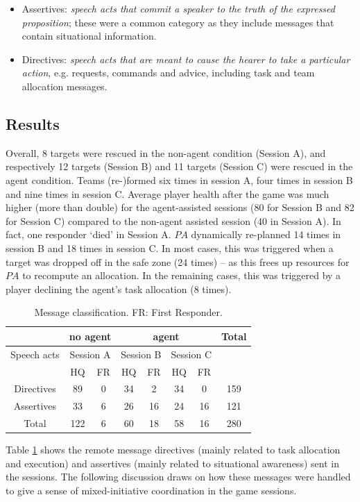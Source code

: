 \begin{itemize}
\item Assertives: \textit{speech acts that commit a speaker to the truth of the expressed proposition}; these were a common category as they include messages that contain situational information.
\item Directives: \textit{speech acts that are meant to cause the hearer to take a particular action}, e.g. requests, commands and advice, including task and team allocation messages. 
\end{itemize}

\subsection{Results}
\noindent Overall, 8 targets were rescued in the non-agent condition (Session A), and respectively 12 targets (Session B) and 11 targets (Session C) were rescued in the agent condition. Teams (re-)formed six times in session A, four times in session B and nine times  in session C. Average player health after the game was much higher (more than double) for the agent-assisted sessions (80 for Session B and 82 for Session C) compared to the non-agent assisted session (40 in Session A). In fact, one responder `died' in Session A.
$PA$ dynamically re-planned 14 times in session B and 18 times in session C. In most cases, this was triggered when a target was dropped off in the safe zone (24 times) -- as this frees up resources for  $PA$ to recompute an allocation. In the remaining cases, this was triggered by a player declining the agent's task allocation (8 times). 



\begin{table}[ht]\small\centering
\begin{tabular}{c | c c | c c c c | c}
 & \multicolumn{2}{c|}{no agent} &  \multicolumn{4}{c|}{agent} & Total \\
 \hline
 Speech acts & \multicolumn{2}{c|}{Session A} & \multicolumn{2}{c}{Session B} & \multicolumn{2}{c|}{Session C} & \\
  & HQ & FR & HQ & FR & HQ & FR & \\
  \hline
  Directives & 89 & 0 & 34 & 2 & 34 & 0 & 159 \\
  Assertives & 33 & 6 & 26 & 16 & 24 & 16 & 121 \\
  \hline
  Total & 122 & 6 & 60 & 18 & 58 & 16 & 280 \\
\end{tabular}
\vspace{-2mm}
 \caption{Message classification. FR: First Responder.} \label{tab:msgs}
\end{table}
Table \ref{tab:msgs} shows the remote message directives (mainly related to task allocation and execution) and assertives (mainly related to situational awareness) sent in the sessions. The following discussion draws on how these messages were handled to give a sense of mixed-initiative coordination in the game sessions.


